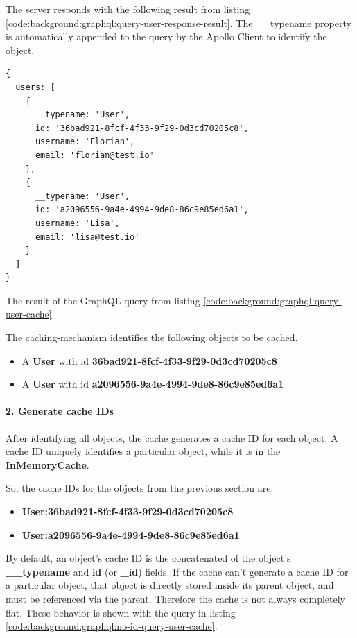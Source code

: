 The server responds with the following result from listing \ref{code:background:graphql:query-user-response-result}. The \_\_typename property is automatically appended to the query by the Apollo Client to identify the object.

\ifshowListings
\begin{listing}[H]
    \begin{verbatim}
{
  users: [
    {
      __typename: 'User',
      id: '36bad921-8fcf-4f33-9f29-0d3cd70205c8',
      username: 'Florian',
      email: 'florian@test.io'
    },
    {
      __typename: 'User',
      id: 'a2096556-9a4e-4994-9de8-86c9e85ed6a1',
      username: 'Lisa',
      email: 'lisa@test.io'
    }
  ]
}
    \end{verbatim}
    \caption{The result of the GraphQL query from listing \ref{code:background:graphql:query-user-cache}}\label{code:background:graphql:query-user-response-result}
\end{listing}
\fi

The caching-mechanism identifies the following objects to be cached.

\begin{itemize}
    \item A \textbf{User} with id \textbf{36bad921-8fcf-4f33-9f29-0d3cd70205c8}
    \item A \textbf{User} with id \textbf{a2096556-9a4e-4994-9de8-86c9e85ed6a1}
\end{itemize}

\paragraph{2. Generate cache IDs}

After identifying all objects, the cache generates a cache ID for each object. A cache ID uniquely identifies a particular object, while it is in the \textbf{InMemoryCache}.

So, the cache IDs for the objects from the previous section are:

\begin{itemize}
    \item \textbf{User:36bad921-8fcf-4f33-9f29-0d3cd70205c8}
    \item \textbf{User:a2096556-9a4e-4994-9de8-86c9e85ed6a1}
\end{itemize}

\noindent By default, an object's cache ID is the concatenated of the object's \textbf{\_\_typename} and \textbf{id} (or \textbf{\_id}) fields. If the cache can't generate a cache ID for a particular object, that object is directly stored inside its parent object, and must be referenced via the parent. Therefore the cache is not always completely flat. These behavior is shown with the query in listing \ref{code:background:graphql:no-id-query-user-cache}. 

